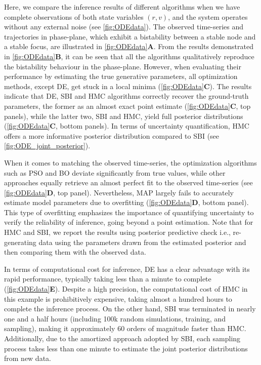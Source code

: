 \documentclass[preprint,11pt,authoryear]{elsarticle}
\begin{document}
Here, we compare the inference results of different algorithms when we have complete observations of both state variables $(r,v)$, and the system operates without any external noise (see \autoref{fig:ODEdata}). The observed time-series and trajectories in phase-plane, which exhibit a bistability between a stable node and a stable focus, are illustrated in \autoref{fig:ODEdata}\textbf{A}. From the results demonstrated in \autoref{fig:ODEdata}\textbf{B}, it can be seen that all the algorithms qualitatively reproduce the bistability behaviour in the phase-plane. However, when evaluating their performance by estimating the true generative parameters, all optimization methods, except DE, get stuck in a local minima (\autoref{fig:ODEdata}\textbf{C}). The results indicate that DE, SBI and HMC algorithms correctly recover the ground-truth parameters, the former as an almost exact point estimate (\autoref{fig:ODEdata}\textbf{C}, top panels), while the latter two, SBI and HMC, yield full posterior distributions (\autoref{fig:ODEdata}\textbf{C}, bottom panels).  In terms of uncertainty quantification, HMC offers a more informative posterior distribution compared to SBI (see \autoref{fig:ODE_joint_posterior}).

When it comes to matching the observed time-series, the optimization algorithms such as PSO and BO deviate significantly from true values, while other approaches equally retrieve an almost perfect fit to the observed time-series (see \autoref{fig:ODEdata}\textbf{D}, top panel). Nevertheless, MAP largely fails to accurately estimate model parameters due to overfitting (\autoref{fig:ODEdata}\textbf{D}, bottom panel). This type of overfitting emphasizes the importance of quantifying uncertainty to verify the reliability of inference, going beyond a point estimation. Note that for HMC and SBI, we report the results using posterior predictive check i.e., re-generating data using the parameters drawn from the estimated posterior and then comparing them with the observed data.

In terms of computational cost for inference, DE has a clear advantage with its rapid performance, typically taking less than a minute to complete (\autoref{fig:ODEdata}\textbf{E}). Despite a high precision, the computational cost of HMC in this example is prohibitively expensive, taking almost a hundred hours to complete the inference process. On the other hand, SBI was terminated in nearly one and a half hours (including 100k random simulations, training, and sampling), making it approximately 60 orders of magnitude faster than HMC. Additionally, due to the amortized approach adopted by SBI, each sampling process takes less than one minute to estimate the joint posterior distributions from new data. 
\end{document}
